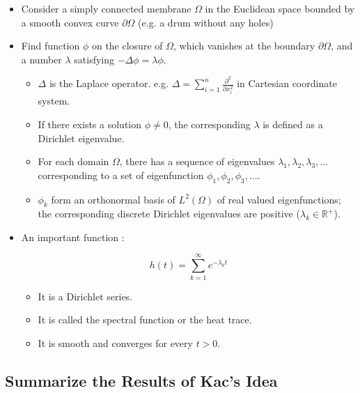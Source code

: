      \begin{itemize}     
       \item Consider a simply connected membrane $\Omega$ in the Euclidean space bounded by a smooth convex curve $\partial \Omega$ (e.g. a drum without any holes)
       \item Find function $\phi$ on the closure of $\Omega$, which vanishes at the boundary $\partial \Omega$, and a number $\lambda$ satisfying $-\Delta \phi = \lambda \phi$.

         \begin{itemize}
           \item $\Delta$ is the Laplace operator. e.g. $\Delta = \sum_{i=1}^{n} \frac{\partial ^2}{\partial x_i^2}$ in Cartesian coordinate system.
           \item If there exists a solution $\phi \neq 0$, the corresponding $\lambda$ is defined as a Dirichlet eigenvalue.
           \item For each domain $\Omega$, there has a sequence of eigenvalues $\lambda_1, \lambda_2, \lambda_3, ... $ corresponding to a set of eigenfunction $\phi_1, \phi_2, \phi_3, ...$.
           \item $\phi_k$ form an orthonormal basis of $L^2(\Omega)$ of real valued eigenfunctions; the corresponding discrete Dirichlet eigenvalues are positive ($\lambda_k \in \mathbb{R}^{+}$).
         \end{itemize}
         
       \item An important function \cite{grieser2013hearing}:

         \begin{equation}\label{eq:heat_trace}
           h(t) = \sum_{k=1}^{\infty} e^{-\lambda_kt}
         \end{equation}
         
         \begin{itemize}  
           \item It is a Dirichlet series.
           \item It is called the spectral function or the heat trace.
           \item It is smooth and converges for every $t>0$.
         \end{itemize}
     \end{itemize}



     \subsection{Summarize the Results of Kac's Idea}

